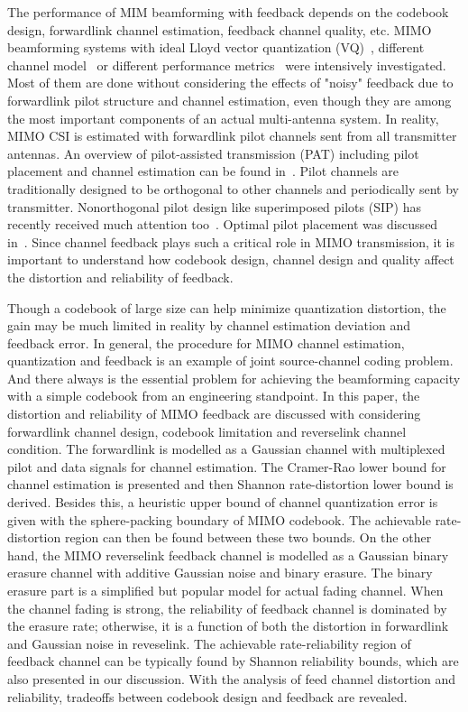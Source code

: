 \documentclass[10pt,fleqn, twocolumn]{IEEEtran}
\begin{document}
The performance of MIM beamforming with feedback depends on the
codebook design, forwardlink channel estimation, feedback channel
quality, etc. MIMO beamforming systems with ideal Lloyd vector
quantization (VQ)~\cite{Narula98}, different channel
model~\cite{Mukka03} or different performance
metrics~\cite{PXia04,Roh04} were intensively investigated. Most of
them are done without considering the effects of "noisy" feedback
due to forwardlink pilot structure and channel estimation, even
though they are among the most important components of an actual
multi-antenna system. In reality, MIMO CSI is estimated with
forwardlink pilot channels sent from all transmitter antennas. An
overview of pilot-assisted transmission (PAT) including pilot
placement and channel estimation can be found in~\cite{Tong04}.
Pilot channels are traditionally designed to be orthogonal to
other channels and periodically sent by transmitter. Nonorthogonal
pilot design like superimposed pilots (SIP) has recently received
much attention too~\cite{Coldrey06}. Optimal pilot placement was
discussed in~\cite{Dong02}. Since channel feedback plays such a
critical role in MIMO transmission, it is important to understand
how codebook design, channel design and quality affect the
distortion and reliability of feedback.


Though a codebook of large size can help minimize quantization
distortion, the gain may be much limited in reality by channel
estimation deviation and feedback error. In general, the procedure
for MIMO channel estimation, quantization and feedback is an
example of joint source-channel coding problem. And there always
is the essential problem for achieving the beamforming capacity
with a simple codebook from an engineering standpoint. In this
paper, the distortion and reliability of MIMO feedback are
discussed with considering forwardlink channel design, codebook
limitation and reverselink channel condition. The forwardlink is
modelled as a Gaussian channel with multiplexed pilot and data
signals for channel estimation. The Cramer-Rao lower bound for
channel estimation is presented and then Shannon rate-distortion
lower bound is derived. Besides this, a heuristic upper bound of
channel quantization error is given with the sphere-packing
boundary of MIMO codebook. The achievable rate-distortion region
can then be found between these two bounds. On the other hand, the
MIMO reverselink feedback channel is modelled as a Gaussian binary
erasure channel with additive Gaussian noise and binary erasure.
The binary erasure part is a simplified but popular model for
actual fading channel. When the channel fading is strong, the
reliability of feedback channel is dominated by the erasure rate;
otherwise, it is a function of both the distortion in forwardlink
and Gaussian noise in reveselink. The achievable rate-reliability
region of feedback channel can be typically found by Shannon
reliability bounds, which are also presented in our discussion.
With the analysis of feed channel distortion and reliability,
tradeoffs between codebook design and feedback are revealed.
\end{document}

